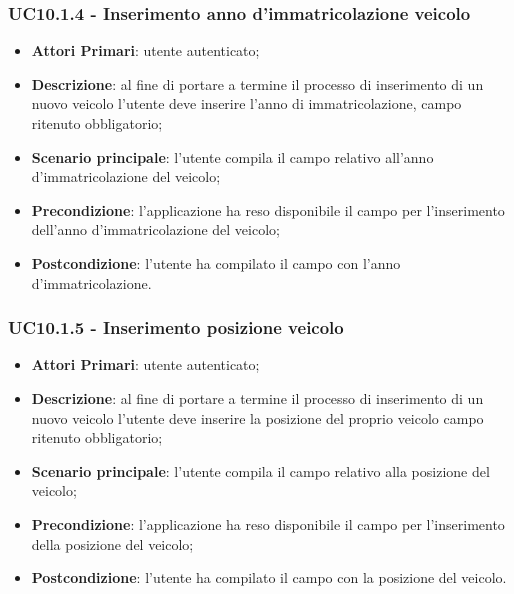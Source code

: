 \subsubsection{UC10.1.4 - Inserimento anno d'immatricolazione veicolo}
\begin{itemize}
	\item \textbf{Attori Primari}: utente autenticato;
	\item \textbf{Descrizione}: al fine di portare a termine il processo di inserimento di un nuovo veicolo l'utente deve inserire l'anno di immatricolazione, campo ritenuto obbligatorio;
	\item \textbf{Scenario principale}: l'utente compila il campo relativo all'anno d'immatricolazione del veicolo;	
	\item \textbf{Precondizione}: l'applicazione ha reso disponibile il campo per l'inserimento dell'anno d'immatricolazione del veicolo;
	\item \textbf{Postcondizione}: l'utente ha compilato il campo con l'anno d'immatricolazione.	
\end{itemize}
\subsubsection{UC10.1.5 - Inserimento posizione veicolo}
\begin{itemize}
	\item \textbf{Attori Primari}: utente autenticato;
	\item \textbf{Descrizione}: al fine di portare a termine il processo di inserimento di un nuovo veicolo l'utente deve inserire la posizione del proprio veicolo campo ritenuto obbligatorio;
	\item \textbf{Scenario principale}: l'utente compila il campo relativo alla posizione del veicolo;	
	\item \textbf{Precondizione}: l'applicazione ha reso disponibile il campo per l'inserimento della posizione del veicolo;
	\item \textbf{Postcondizione}: l'utente ha compilato il campo con la posizione del veicolo.	
\end{itemize}
